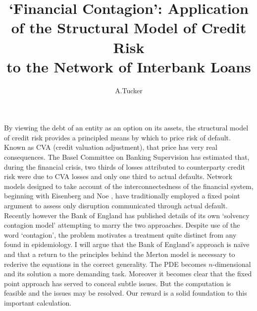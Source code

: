 \documentclass[11pt, a4paper]{article}
\begin{document}
\title{\vspace{-3.0cm}\large\textbf{`Financial Contagion': Application of the
    Structural Model of
    Credit Risk\\to the Network of Interbank Loans}}

\author[*]{\footnotesize A.\@ Tucker}
\date{\vspace{-5ex}}

\maketitle
\thispagestyle{empty}

\noindent
By viewing the debt of an entity as an option on its assets, the structural
model of credit risk \cite{merton} provides a principled means by which to price risk of default.
Known as CVA (credit valuation adjustment), that price has very real
consequences.
The Basel
Committee on Banking Supervision has estimated that, during
the financial crisis,
two thirds of losses attributed to counterparty credit risk were due to
CVA losses and only one third to actual defaults.
Network models designed to take account of the interconnectedness of the
financial system, beginning with Eisenberg and Noe \cite{eisenberg-noe}, have traditionally
employed a fixed point argument to assess only disruption communicated through actual default.
Recently however the Bank of England has published details of its own
`solvency contagion model' \cite{bardoscia} attempting to marry the two
approaches.
Despite use of the word `contagion', the problem motivates a treatment quite
distinct from any found in epidemiology.
I will argue that the Bank of England's approach is na\"ive and that a return to the principles behind the Merton model
is necessary to rederive the equations in the correct generality.
The PDE becomes $n$-dimensional and its solution a
more demanding task.
Moreover it becomes clear
that the fixed point approach has served to conceal subtle issues.
But the computation is feasible and the issues may be resolved. Our reward is a solid foundation to this
important calculation.
\end{document}
